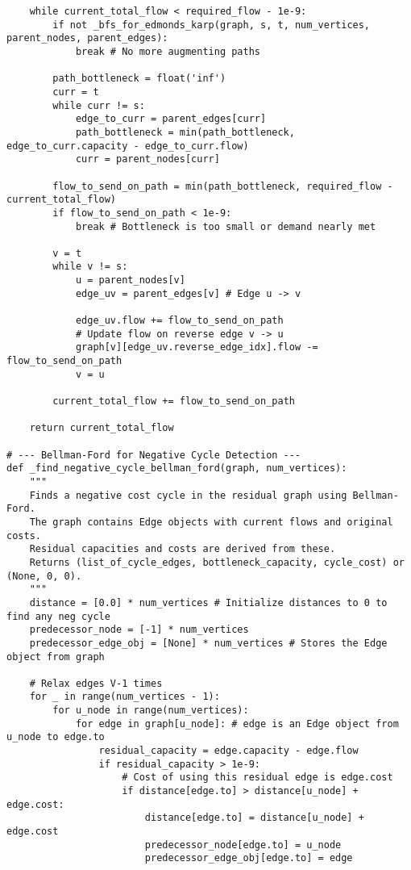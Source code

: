 \begin{verbatim}
    while current_total_flow < required_flow - 1e-9:
        if not _bfs_for_edmonds_karp(graph, s, t, num_vertices, parent_nodes, parent_edges):
            break # No more augmenting paths

        path_bottleneck = float('inf')
        curr = t
        while curr != s:
            edge_to_curr = parent_edges[curr]
            path_bottleneck = min(path_bottleneck, edge_to_curr.capacity - edge_to_curr.flow)
            curr = parent_nodes[curr]
        
        flow_to_send_on_path = min(path_bottleneck, required_flow - current_total_flow)
        if flow_to_send_on_path < 1e-9:
            break # Bottleneck is too small or demand nearly met

        v = t
        while v != s:
            u = parent_nodes[v]
            edge_uv = parent_edges[v] # Edge u -> v
            
            edge_uv.flow += flow_to_send_on_path
            # Update flow on reverse edge v -> u
            graph[v][edge_uv.reverse_edge_idx].flow -= flow_to_send_on_path
            v = u
        
        current_total_flow += flow_to_send_on_path
        
    return current_total_flow

# --- Bellman-Ford for Negative Cycle Detection ---
def _find_negative_cycle_bellman_ford(graph, num_vertices):
    """
    Finds a negative cost cycle in the residual graph using Bellman-Ford.
    The graph contains Edge objects with current flows and original costs.
    Residual capacities and costs are derived from these.
    Returns (list_of_cycle_edges, bottleneck_capacity, cycle_cost) or (None, 0, 0).
    """
    distance = [0.0] * num_vertices # Initialize distances to 0 to find any neg cycle
    predecessor_node = [-1] * num_vertices
    predecessor_edge_obj = [None] * num_vertices # Stores the Edge object from graph

    # Relax edges V-1 times
    for _ in range(num_vertices - 1):
        for u_node in range(num_vertices):
            for edge in graph[u_node]: # edge is an Edge object from u_node to edge.to
                residual_capacity = edge.capacity - edge.flow
                if residual_capacity > 1e-9:
                    # Cost of using this residual edge is edge.cost
                    if distance[edge.to] > distance[u_node] + edge.cost:
                        distance[edge.to] = distance[u_node] + edge.cost
                        predecessor_node[edge.to] = u_node
                        predecessor_edge_obj[edge.to] = edge
    

\end{verbatim}
